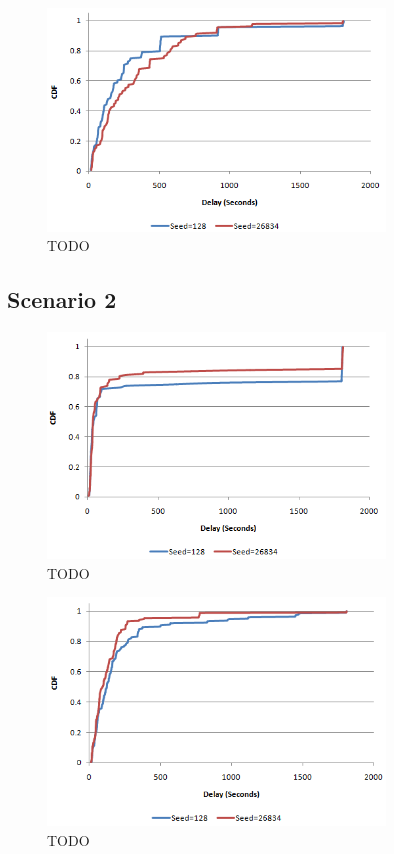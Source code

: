 \begin{figure}[htbp]
    \centering
    \includegraphics[width=0.8\textwidth]{images/result_delay_sim1byseed_mc30}
    \caption{TODO}
\end{figure}

\subsection{Scenario 2}

\begin{figure}[htbp]
    \centering
    \includegraphics[width=0.8\textwidth]{images/result_delay_sim2byseed_mc3}
    \caption{TODO}
\end{figure}


\begin{figure}[htbp]
    \centering
    \includegraphics[width=0.8\textwidth]{images/result_delay_sim2byseed_mc30}
    \caption{TODO}
\end{figure}


